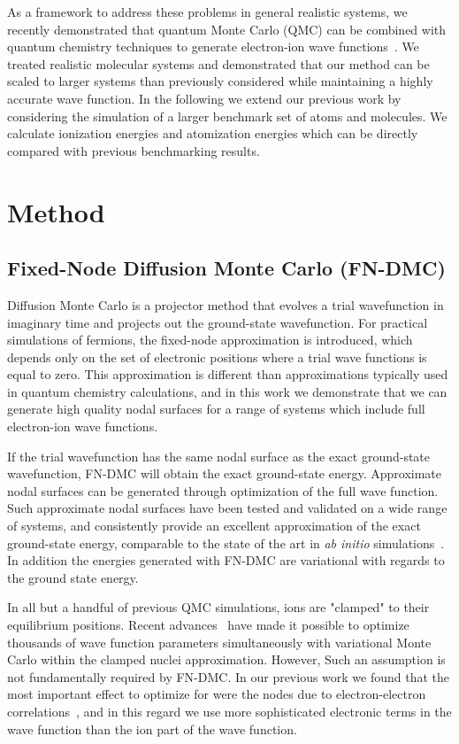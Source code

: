 \documentclass[pra,superscriptaddress,groupedaddress,twocolumn]{revtex4}
\begin{document}
As a framework to address these problems in general realistic systems, we recently demonstrated that quantum Monte Carlo (QMC) can be combined with quantum chemistry techniques to generate electron-ion wave functions~\cite{Tubman_ECG}.  We treated realistic molecular systems and demonstrated that our method can be scaled to larger systems than previously considered while maintaining a highly accurate wave function. In the following we extend our previous work by considering the simulation of a larger benchmark set of atoms and molecules.  We calculate ionization energies and atomization energies which can be directly compared with previous benchmarking results.

\section{Method}
\subsection{Fixed-Node Diffusion Monte Carlo (FN-DMC)}
Diffusion Monte Carlo is a projector method that evolves a trial wavefunction in imaginary time and projects out the ground-state wavefunction.  For practical simulations of fermions, the fixed-node approximation is introduced, which depends only on the set of electronic positions where a trial wave functions is equal to zero.  This approximation is different than approximations typically used in quantum chemistry calculations, and in this work we demonstrate that we can generate high quality nodal surfaces for a range of systems which include full electron-ion wave functions. 

If the trial wavefunction has the same nodal surface as the exact ground-state wavefunction, FN-DMC will obtain the exact ground-state energy.  Approximate nodal surfaces can be generated through optimization of the full wave function. Such approximate nodal surfaces have been tested and validated on a wide range of systems, and consistently provide an excellent approximation of the exact ground-state energy,  comparable to the state of the art in \textit{ab initio} simulations~\cite{grossman1}. In addition the energies generated with FN-DMC are variational with regards to the ground state energy.

In all but a handful of previous QMC simulations, ions are "clamped" to their equilibrium positions. Recent advances~\cite{Nightingale_Linear,Umrigar_Linear,Brown_Bench} have made it possible to optimize thousands of wave function parameters simultaneously with variational Monte Carlo within the clamped nuclei approximation. However, Such an assumption is not fundamentally required by FN-DMC.  In our previous work we found that the most important effect to optimize for were the nodes due to electron-electron correlations~\cite{Tubman_ECG}, and in this regard we use more sophisticated electronic terms in the wave function than the ion part of the wave function.
\end{document}
